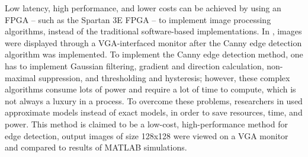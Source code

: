 \par	Low latency, high performance, and lower costs can be achieved by using an FPGA – such as the Spartan 3E FPGA – to implement image processing algorithms, instead of the traditional software-based implementations. In \cite{twenty_five}, images were displayed through a VGA-interfaced monitor after the Canny edge detection algorithm was implemented. To implement the Canny edge detection method, one has to implement Gaussian filtering, gradient and direction calculation, non-maximal suppression, and thresholding and hysteresis; however, these complex algorithms consume lots of power and require a lot of time to compute, which is not always a luxury in a process. To overcome these problems, researchers in \cite{twenty_five} used approximate models instead of exact models, in order to save resources, time, and power. This method is claimed to be a low-cost, high-performance method for edge detection, output images of size 128x128 were viewed on a VGA monitor and compared to results of MATLAB simulations. \newline



\medskip

%